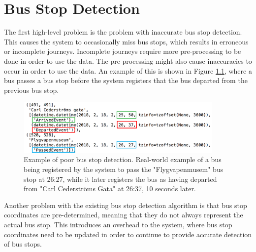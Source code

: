 \chapter{Bus Stop Detection}
\label{cha:bus-stop-detection}

The first high-level problem is the problem with inaccurate bus stop detection.
This causes the system to occasionally miss bus stops, which results in erroneous or incomplete journeys.
Incomplete journeys require more pre-processing to be done in order to use the data.
The pre-processing might also cause inaccuracies to occur in order to use the data.
An example of this is shown in Figure \ref{fig:passed-before-departed}, where a bus passes a bus stop before the system registers that the bus departed from the previous bus stop.

\begin{figure}[ht!]
    \centering
    \includegraphics[width=0.9\textwidth]{figures/bad_timing}
    \caption[Example of poor bus stop detection]%
    {\small Example of poor bus stop detection. Real-world example of a bus being registered by the system to pass the "Flygvapenmusem" bus stop at 26:27,
    while it later registers the bus as having departed from "Carl Cederströms Gata" at 26:37, 10 seconds later.
    }
    \label{fig:passed-before-departed}
\end{figure}

Another problem with the existing bus stop detection algorithm is that bus stop coordinates are pre-determined, meaning that they do not always represent the actual bus stop.
This introduces an overhead to the system, where bus stop coordinates need to be updated in order to continue to provide accurate detection of bus stops.

